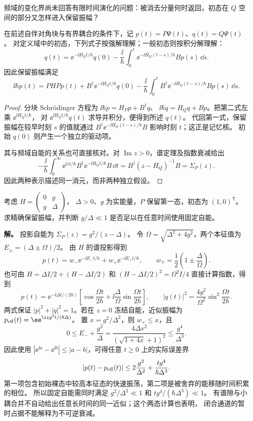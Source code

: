 频域的变化界尚未回答有限时间演化的问题：被消去分量何时返回，初态在 $Q$ 空间的部分又怎样进入保留振幅？
\begin{proposition}[分块演化的记忆方程]
在前述自伴对角块与有界耦合的条件下，记 $p(t)=P\Psi(t)$、$q(t)=Q\Psi(t)$。
对定义域中的初态，下列式子按强解理解；一般初态则按积分解理解：
\[
q(t)=\ee^{-\ii H_Qt/\hbar}q(0)
-\frac{\ii}{\hbar}\int_0^t\ee^{-\ii H_Q(t-s)/\hbar}Bp(s)\,\dd s.
\]
因此保留振幅满足
\begin{equation}
\ii\hbar\dot p(t)=PHPp(t)+B^\dagger\ee^{-\ii H_Qt/\hbar}q(0)
-\frac{\ii}{\hbar}\int_0^t B^\dagger\ee^{-\ii H_Q(t-s)/\hbar}Bp(s)\,\dd s.
\label{eq:feqo-feshbach-exact-amplitude-memory}
\end{equation}
\end{proposition}
\begin{proof}
分块 Schr\"odinger 方程为
$\ii\hbar\dot p=H_Pp+B^\dagger q$、
$\ii\hbar\dot q=H_Qq+Bp$。把第二式左乘 $\ee^{\ii H_Qt/\hbar}$，
对 $\ee^{\ii H_Qt/\hbar}q(t)$ 求导并积分，便得到所述 $q(t)$。
代回第一式，保留振幅在较早时刻 $s$ 的值就通过
$B^\dagger\ee^{-\ii H_Q(t-s)/\hbar}B$ 影响时刻 $t$；这正是记忆核。
初始 $q(0)$ 则产生一个独立的驱动项。

其与频域自能的关系也可直接核对。对 $\operatorname{Im}z>0$，谱定理及指数衰减给出
\[
-\frac{\ii}{\hbar}\int_0^\infty
\ee^{\ii zt/\hbar}B^\dagger\ee^{-\ii H_Qt/\hbar}B\,\dd t
=B^\dagger(z-H_Q)^{-1}B=\Sigma_P(z).
\]
因此两种表示描述同一消元，而非两种独立假设。
\end{proof}

\begin{exbox}[有谱隙的两态消元与初始瞬态]
考虑 $H=\left(\begin{smallmatrix}0&g\\g&\Delta\end{smallmatrix}\right)$，
$\Delta>0$、$g$ 为实能量，$P$ 保留第一态，初态为 $(1,0)^{\mathsf T}$。
求精确保留振幅，并判断 $g/\Delta\ll1$ 是否足以在任意时间使用固定自能。

\textbf{解。} 投影自能为 $\Sigma_P(z)=g^2/(z-\Delta)$。
令 $\Omega=\sqrt{\Delta^2+4g^2}$，两个本征值为 $E_\pm=(\Delta\pm\Omega)/2$。
由 $H$ 的谱投影得到
\[
p(t)=w_-\ee^{-\ii E_-t/\hbar}+w_+\ee^{-\ii E_+t/\hbar},\qquad
w_\mp=\frac12\left(1\pm\frac\Delta\Omega\right).
\]
也可由 $H=\Delta I/2+(H-\Delta I/2)$ 和
$(H-\Delta I/2)^2=\Omega^2I/4$ 直接计算指数，得到
\[
p(t)=\ee^{-\ii\Delta t/(2\hbar)}
\left[\cos\frac{\Omega t}{2\hbar}
+\ii\frac\Delta\Omega\sin\frac{\Omega t}{2\hbar}\right],\qquad
|q(t)|^2=\frac{4g^2}{\Omega^2}\sin^2\frac{\Omega t}{2\hbar}.
\]
两式保证 $|p|^2+|q|^2=1$。若在 $z=0$ 冻结自能，近似振幅为
$p_{\rm eff}(t)=\ee^{\ii g^2t/(\hbar\Delta)}$。
置 $x=g^2/\Delta^2$，则 $w_+\le x$，且
\[
0\le E_-+\frac{g^2}{\Delta}
=\frac{4\Delta x^2}{(\sqrt{1+4x}+1)^2}\le\frac{g^4}{\Delta^3}.
\]
因此使用 $|\ee^{\ii a}-\ee^{\ii b}|\le|a-b|$，可得任意 $t\ge0$ 上的实际误差界
\[
|p(t)-p_{\rm eff}(t)|\le
2\frac{g^2}{\Delta^2}+\frac{tg^4}{\hbar\Delta^3}.
\]
第一项包含初始裸态中较高本征态的快速振荡，第二项是被舍弃的能移随时间积累的相位。
所以固定自能需同时满足 $g^2/\Delta^2\ll1$ 和 $tg^4/(\hbar\Delta^3)\ll1$。
有谱隙与小耦合并不自动给出任意长时间的同一近似；这个两态计算也表明，
闭合通道的暂时占据不能解释为不可逆衰减。
\end{exbox}

